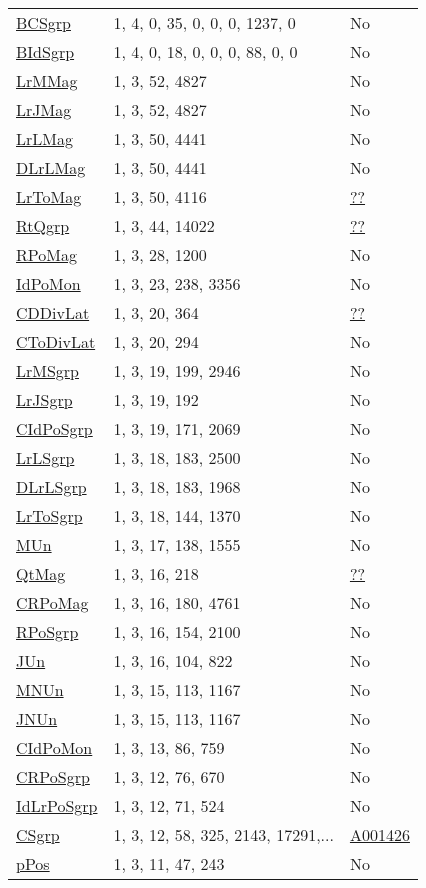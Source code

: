 {\begin{tabular}{|l|l|l|}
\hyperlink{BCSgrp}{BCSgrp}& 1, 4, 0, 35, 0, 0, 0, 1237, 0 &No\\
\hyperlink{BIdSgrp}{BIdSgrp}& 1, 4, 0, 18, 0, 0, 0, 88, 0, 0 &No\\
\hyperlink{LrMMag}{LrMMag}& 1, 3, 52, 4827 &No\\
\hyperlink{LrJMag}{LrJMag}& 1, 3, 52, 4827 &No\\
\hyperlink{LrLMag}{LrLMag}& 1, 3, 50, 4441 &No\\
\hyperlink{DLrLMag}{DLrLMag}& 1, 3, 50, 4441 &No\\
\hyperlink{LrToMag}{LrToMag}& 1, 3, 50, 4116 &\href{http://oeis.org/A071094}{??}\\
\hyperlink{RtQgrp}{RtQgrp}& 1, 3, 44, 14022 &\href{http://oeis.org/A193623}{??}\\
\hyperlink{RPoMag}{RPoMag}& 1, 3, 28, 1200 &No\\
\hyperlink{IdPoMon}{IdPoMon}& 1, 3, 23, 238, 3356 &No\\
\hyperlink{CDDivLat}{CDDivLat}& 1, 3, 20, 364 &\href{http://oeis.org/A003150}{??}\\
\hyperlink{CToDivLat}{CToDivLat}& 1, 3, 20, 294 &No\\
\hyperlink{LrMSgrp}{LrMSgrp}& 1, 3, 19, 199, 2946 &No\\
\hyperlink{LrJSgrp}{LrJSgrp}& 1, 3, 19, 192 &No\\
\hyperlink{CIdPoSgrp}{CIdPoSgrp}& 1, 3, 19, 171, 2069 &No\\
\hyperlink{LrLSgrp}{LrLSgrp}& 1, 3, 18, 183, 2500 &No\\
\hyperlink{DLrLSgrp}{DLrLSgrp}& 1, 3, 18, 183, 1968 &No\\
\hyperlink{LrToSgrp}{LrToSgrp}& 1, 3, 18, 144, 1370 &No\\
\hyperlink{MUn}{MUn}& 1, 3, 17, 138, 1555 &No\\
\hyperlink{QtMag}{QtMag}& 1, 3, 16, 218 &\href{http://oeis.org/A000273}{??}\\
\hyperlink{CRPoMag}{CRPoMag}& 1, 3, 16, 180, 4761 &No\\
\hyperlink{RPoSgrp}{RPoSgrp}& 1, 3, 16, 154, 2100 &No\\
\hyperlink{JUn}{JUn}& 1, 3, 16, 104, 822 &No\\
\hyperlink{MNUn}{MNUn}& 1, 3, 15, 113, 1167 &No\\
\hyperlink{JNUn}{JNUn}& 1, 3, 15, 113, 1167 &No\\
\hyperlink{CIdPoMon}{CIdPoMon}& 1, 3, 13, 86, 759 &No\\
\hyperlink{CRPoSgrp}{CRPoSgrp}& 1, 3, 12, 76, 670 &No\\
\hyperlink{IdLrPoSgrp}{IdLrPoSgrp}& 1, 3, 12, 71, 524 &No\\
\hyperlink{CSgrp}{CSgrp}& 1, 3, 12, 58, 325, 2143, 17291,... &\href{http://oeis.org/A001426}{A001426}\\
\hyperlink{pPos}{pPos}& 1, 3, 11, 47, 243 &No\\
\end{tabular}

}
